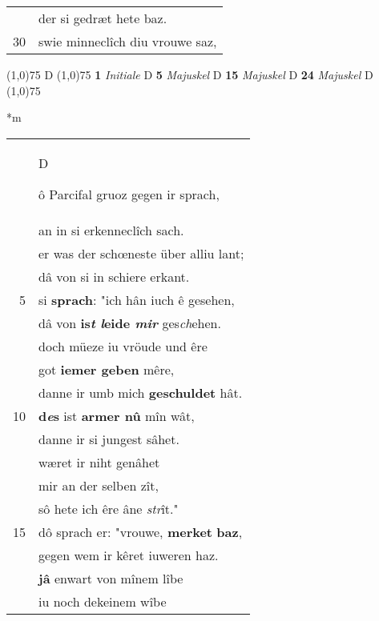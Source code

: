 \documentclass[8pt,a4paper,notitlepage]{article}
\begin{document}
\begin{table}[ht]
\begin{minipage}[t]{0.5\linewidth}
\begin{tabular}{rl}
 & der si gedræt hete baz.\\ 
30 & swie minneclîch diu vrouwe saz,\\ 
\end{tabular}
\scriptsize
\line(1,0){75} \newline
D \newline
\line(1,0){75} \newline
\textbf{1} \textit{Initiale} D  \textbf{5} \textit{Majuskel} D  \textbf{15} \textit{Majuskel} D  \textbf{24} \textit{Majuskel} D  \newline
\line(1,0){75} \newline
\newline
\end{minipage}
\hspace{0.5cm}
\begin{minipage}[t]{0.5\linewidth}
\small
\begin{center}*m
\end{center}
\begin{tabular}{rl}
 & \begin{large}D\end{large}ô Parcifal gruoz gegen ir sprach,\\ 
 & an in si erkenneclîch sach.\\ 
 & er was der schœneste über alliu lant;\\ 
 & dâ von si in schiere erkant.\\ 
5 & si \textbf{sprach}: "ich hân iuch ê gesehen,\\ 
 & dâ von \textbf{is\textit{t} \textit{l}eide \textit{mir}} ges\textit{ch}ehen.\\ 
 & doch müeze iu vröude und êre\\ 
 & got \textbf{iemer geben} mêre,\\ 
 & danne ir umb mich \textbf{geschuldet} hât.\\ 
10 & \textbf{d\textit{e}s} ist \textbf{armer nû} mîn wât,\\ 
 & danne ir si jungest sâhet.\\ 
 & wæret ir niht genâhet\\ 
 & mir an der selben zît,\\ 
 & sô hete ich êre âne \textit{str}ît."\\ 
15 & dô sprach er: "vrouwe, \textbf{merket} \textbf{baz},\\ 
 & gegen wem ir kêret iuweren haz.\\ 
 & \textbf{jâ} enwart von mînem lîbe\\ 
 & iu noch dekeinem wîbe\\ 

\end{tabular}
\end{minipage}
\end{table}
\end{document}

